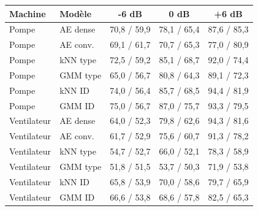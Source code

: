 \begin{tabular}{llccc}
\toprule
Machine & Modèle & -6 dB & 0 dB & +6 dB \\
\midrule
Pompe & AE dense & 70,8 / 59,9 & 78,1 / 65,4 & 87,6 / 85,3 \\
Pompe & AE conv. & 69,1 / 61,7 & 70,7 / 65,3 & 77,0 / 80,9 \\
Pompe & kNN type & 72,5 / 59,2 & 85,1 / 68,7 & 92,0 / 74,4 \\
Pompe & GMM type & 65,0 / 56,7 & 80,8 / 64,3 & 89,1 / 72,3 \\
Pompe & kNN ID & 74,0 / 56,4 & 85,7 / 68,5 & 94,4 / 81,9 \\
Pompe & GMM ID & 75,0 / 56,7 & 87,0 / 75,7 & 93,3 / 79,5 \\
\midrule
Ventilateur & AE dense & 64,0 / 52,3 & 79,8 / 62,6 & 94,3 / 81,6 \\
Ventilateur & AE conv. & 61,7 / 52,9 & 75,6 / 60,7 & 91,3 / 78,2 \\
Ventilateur & kNN type & 54,7 / 52,7 & 66,0 / 52,1 & 78,3 / 58,9 \\
Ventilateur & GMM type & 51,8 / 51,5 & 53,7 / 50,3 & 71,9 / 53,8 \\
Ventilateur & kNN ID & 65,8 / 53,9 & 70,0 / 58,6 & 79,7 / 65,9 \\
Ventilateur & GMM ID & 66,6 / 53,8 & 68,6 / 57,8 & 82,5 / 65,3 \\
\bottomrule
\end{tabular}